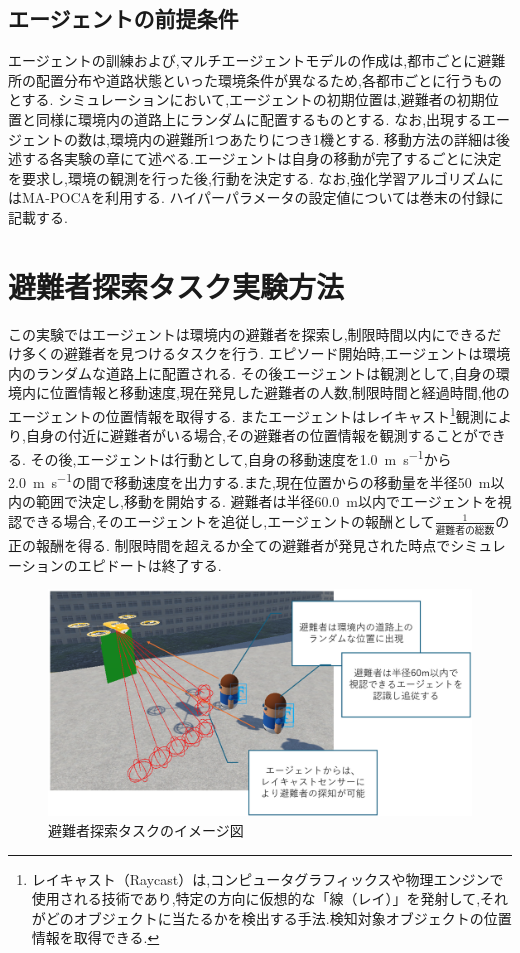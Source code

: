 \subsection{エージェントの前提条件}
エージェントの訓練および,マルチエージェントモデルの作成は,都市ごとに避難所の配置分布や道路状態といった環境条件が異なるため,各都市ごとに行うものとする.
シミュレーションにおいて,エージェントの初期位置は,避難者の初期位置と同様に環境内の道路上にランダムに配置するものとする.
なお,出現するエージェントの数は,環境内の避難所1つあたりにつき1機とする.
移動方法の詳細は後述する各実験の章にて述べる.エージェントは自身の移動が完了するごとに決定を要求し,環境の観測を行った後,行動を決定する.
なお,強化学習アルゴリズムにはMA-POCAを利用する.
ハイパーパラメータの設定値については巻末の付録に記載する.

\section{避難者探索タスク実験方法}
この実験ではエージェントは環境内の避難者を探索し,制限時間以内にできるだけ多くの避難者を見つけるタスクを行う.
エピソード開始時,エージェントは環境内のランダムな道路上に配置される.
その後エージェントは観測として,自身の環境内に位置情報と移動速度,現在発見した避難者の人数,制限時間と経過時間,他のエージェントの位置情報を取得する.
またエージェントはレイキャスト\footnote{レイキャスト（Raycast）は,コンピュータグラフィックスや物理エンジンで使用される技術であり,特定の方向に仮想的な「線（レイ）」を発射して,それがどのオブジェクトに当たるかを検出する手法.検知対象オブジェクトの位置情報を取得できる.}観測により,自身の付近に避難者がいる場合,その避難者の位置情報を観測することができる.
その後,エージェントは行動として,自身の移動速度を\SI{1.0}{\meter\per\second}から\SI{2.0}{\meter\per\second}の間で移動速度を出力する.また,現在位置からの移動量を半径\SI{50}{\meter}以内の範囲で決定し,移動を開始する.
避難者は半径\SI{60.0}{\meter}以内でエージェントを視認できる場合,そのエージェントを追従し,エージェントの報酬として$\frac{1}{避難者の総数}$の正の報酬を得る.
制限時間を超えるか全ての避難者が発見された時点でシミュレーションのエピドートは終了する.
\begin{figure}[H] 
  \centering 
  \includegraphics[width=1.0\textwidth]{Figures/SearchEx.png}
  \caption{避難者探索タスクのイメージ図} 
  \label{fig:01} 
\end{figure}
